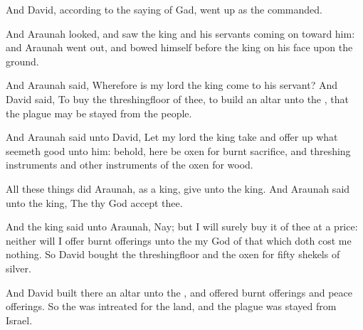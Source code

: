 \verse And David, according to the saying of Gad, went up as the \LORD commanded.

\verse And Araunah looked, and saw the king and his servants coming on toward him: and Araunah went out, and bowed himself before the king on his face upon the ground.

\verse And Araunah said, Wherefore is my lord the king come to his servant?  And David said, To buy the threshingfloor of thee, to build an altar unto the \LORD, that the plague may be stayed from the people.

\verse And Araunah said unto David, Let my lord the king take and offer up what seemeth good unto him: behold, here be oxen for burnt sacrifice, and threshing instruments and other instruments of the oxen for wood.

\verse All these things did Araunah, as a king, give unto the king. And Araunah said unto the king, The \LORD thy God accept thee.

\verse And the king said unto Araunah, Nay; but I will surely buy it of thee at a price: neither will I offer burnt offerings unto the \LORD my God of that which doth cost me nothing. So David bought the threshingfloor and the oxen for fifty shekels of silver.

\verse And David built there an altar unto the \LORD, and offered burnt offerings and peace offerings. So the \LORD was intreated for the land, and the plague was stayed from Israel.

